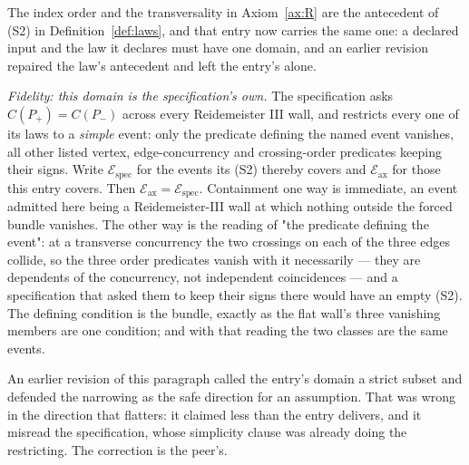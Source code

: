 \begin{remark}
\label{rem:axRhistory}
The index order and the transversality in Axiom~\ref{ax:R} are the antecedent
of (S2) in Definition~\ref{def:laws}, and that entry now carries the same one: a
declared input and the law it declares must have one domain, and an earlier
revision repaired the law's antecedent and left the entry's alone.

\emph{Fidelity: this domain is the specification's own.} The specification asks
$C(P_+)=C(P_-)$ across every Reidemeister III wall, and restricts every one of
its laws to a \emph{simple} event: only the predicate defining the named event
vanishes, all other listed vertex, edge-concurrency and crossing-order
predicates keeping their signs. Write $\mathcal E_{\mathrm{spec}}$ for the
events its (S2) thereby covers and $\mathcal E_{\mathrm{ax}}$ for those this
entry covers. Then $\mathcal E_{\mathrm{ax}}=\mathcal E_{\mathrm{spec}}$.
Containment one way is immediate, an event admitted here being a
Reidemeister-III wall at which nothing outside the forced bundle vanishes. The
other way is the reading of "the predicate defining the event": at a transverse
concurrency the two crossings on each of the three edges collide, so the three
order predicates vanish with it necessarily --- they are dependents of the
concurrency, not independent coincidences --- and a specification that asked
them to keep their signs there would have an empty (S2). The defining condition
is the bundle, exactly as the flat wall's three vanishing members are one
condition; and with that reading the two classes are the same events.

An earlier revision of this paragraph called the entry's domain a strict
subset and defended the narrowing as the safe direction for an assumption. That
was wrong in the direction that flatters: it claimed less than the entry
delivers, and it misread the specification, whose simplicity clause was already
doing the restricting. The correction is the peer's.


\end{remark}
